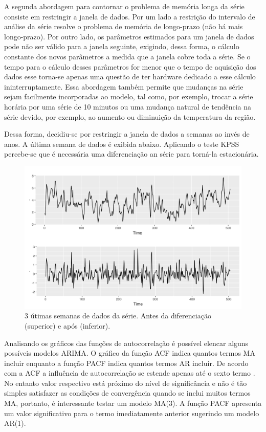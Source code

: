 \documentclass[
	12pt,				%
	openright,			%
	oneside,			%
	a4paper,			%
	english,			%
	french,				%
	spanish,			%
	brazil				%
	]{abntex2}
\begin{document}
A segunda abordagem para contornar o problema de memória longa da série consiste em restringir a janela de dados. Por um lado a restrição do intervalo de análise da série resolve o problema de memória de longo-prazo (não há mais longo-prazo). Por outro lado, os parâmetros estimados para um janela de dados pode não ser válido para a janela seguinte, exigindo, dessa forma, o cálculo constante dos novos parâmetros a medida que a janela cobre toda a série. Se o tempo para o cálculo desses parâmetros for menor que o tempo de aquisição dos dados esse torna-se apenas uma questão de ter hardware dedicado a esse cálculo ininterruptamente. Essa abordagem também permite que mudanças na série sejam facilmente incorporadas ao modelo, tal como, por exemplo, trocar a série horária por uma série de 10 minutos ou uma mudança natural de tendência na série devido, por exemplo, ao aumento ou diminuição da temperatura da região.

Dessa forma, decidiu-se por restringir a janela de dados a semanas ao invés de anos. A última semana de dados é exibida abaixo. Aplicando o teste KPSS percebe-se que é necessária uma diferenciação an série para torná-la estacionária.

\begin{figure}[h]
    \centering
	\includegraphics[width=\textwidth]{last3weeks.png}
	\caption{3 útimas semanas de dados da série. Antes da diferenciação (superior) e após (inferior).}
\end{figure}
\FloatBarrier 

Analisando os gráficos das funções de autocorrelação é possível elencar alguns possíveis modelos ARIMA. O gráfico da função ACF indica quantos termos MA incluir enquanto a função PACF indica quantos termos AR incluir. De acordo com a ACF a influência de autocorrelação se estende apenas até o sexto termo . No entanto valor respectivo está próximo do nível de significância e não é tão simples satisfazer as condições de convergência quando se inclui muitos termos MA, portanto, é interessante testar um modelo MA(3). A função PACF apresenta um valor significativo para o termo imediatamente anterior sugerindo um modelo AR(1). 
\end{document}
